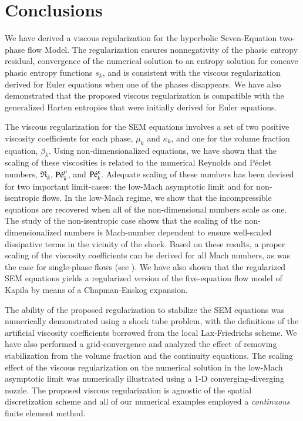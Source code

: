 \section{Conclusions}\label{sec:conclusion}
%
We have derived a viscous regularization for the hyperbolic Seven-Equation two-phase flow Model. 
The regularization ensures nonnegativity of the phasic entropy residual, 
convergence of the numerical solution to an entropy solution for concave phasic entropy functions $s_k$,
and is consistent with the viscous regularization derived for Euler equations when one of the phases disappears. 
We have also demonstrated that the proposed viscous regularization is compatible with the generalized Harten entropies 
that were initially derived for Euler equations. 

The viscous regularization for the SEM equations involves a set of two positive viscosity coefficients for each phase, $\mu_k$ and $\kappa_k$, and one for the volume 
fraction equation, $\beta_k$. Using non-dimensionalized equations, we have shown that the scaling of these viscosities is related to the numerical Reynolds 
and P\'eclet numbers, $\Re_k$, $\textrm{P\'e}_k^\mu$, and $\textrm{P\'e}_k^\kappa$. 
Adequate scaling of these numbers has been devised for two important limit-cases: the low-Mach asymptotic limit and for non-isentropic flows. In the low-Mach regime, 
we show that the incompressible equations are recovered when all of the non-dimensional numbers scale as one. The study of the non-isentropic case 
shows that the scaling of the non-dimensionalized numbers is Mach-number dependent to ensure well-scaled dissipative terms in the vicinity of the shock.
Based on these results, a proper scaling of the viscosity coefficients can be derived for all Mach numbers, as was the case for single-phase flows (see \cite{Marco_paper_low_mach}). 
%
We have also shown that the regularized SEM equations yields a regularized version of the five-equation flow model of Kapila by means of a Chapman-Enskog expansion.

The ability of the proposed regularization to stabilize the SEM equations was numerically demonstrated using a shock tube problem, with the definitions of the 
artificial viscosity coefficients borrowed from the local Lax-Friedrichs scheme. We have also performed a grid-convergence and analyzed the effect of removing 
stabilization from the volume fraction and the continuity equations. The scaling effect of the viscous regularization on the numerical solution in the low-Mach 
asymptotic limit was numerically illustrated using a 1-D converging-diverging nozzle. The proposed viscous regularization is agnostic of the spatial discretization
scheme and all of our numerical examples employed a {\it continuous} finite element method.

